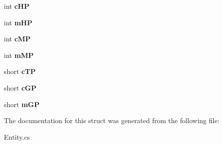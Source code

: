 \begin{DoxyCompactItemize}
\item 
\hypertarget{structffxivlib_1_1_entity_1_1_e_n_t_i_t_y_i_n_f_o_a4eb1c6c096373de42566abdbf6bc5921}{int {\bfseries c\-H\-P}}\label{structffxivlib_1_1_entity_1_1_e_n_t_i_t_y_i_n_f_o_a4eb1c6c096373de42566abdbf6bc5921}

\item 
\hypertarget{structffxivlib_1_1_entity_1_1_e_n_t_i_t_y_i_n_f_o_af2cbe0f7b155434b9995482b59a45992}{int {\bfseries m\-H\-P}}\label{structffxivlib_1_1_entity_1_1_e_n_t_i_t_y_i_n_f_o_af2cbe0f7b155434b9995482b59a45992}

\item 
\hypertarget{structffxivlib_1_1_entity_1_1_e_n_t_i_t_y_i_n_f_o_a81af69b94f15abeba9263682bd805ab5}{int {\bfseries c\-M\-P}}\label{structffxivlib_1_1_entity_1_1_e_n_t_i_t_y_i_n_f_o_a81af69b94f15abeba9263682bd805ab5}

\item 
\hypertarget{structffxivlib_1_1_entity_1_1_e_n_t_i_t_y_i_n_f_o_a3aad5eb2ed4ecff5e902cd054daf2d9b}{int {\bfseries m\-M\-P}}\label{structffxivlib_1_1_entity_1_1_e_n_t_i_t_y_i_n_f_o_a3aad5eb2ed4ecff5e902cd054daf2d9b}

\item 
\hypertarget{structffxivlib_1_1_entity_1_1_e_n_t_i_t_y_i_n_f_o_a680dced63aeb961d2d7ff24372f0b3df}{short {\bfseries c\-T\-P}}\label{structffxivlib_1_1_entity_1_1_e_n_t_i_t_y_i_n_f_o_a680dced63aeb961d2d7ff24372f0b3df}

\item 
\hypertarget{structffxivlib_1_1_entity_1_1_e_n_t_i_t_y_i_n_f_o_a905fc67478130ba6433fe2b9b4d0ddec}{short {\bfseries c\-G\-P}}\label{structffxivlib_1_1_entity_1_1_e_n_t_i_t_y_i_n_f_o_a905fc67478130ba6433fe2b9b4d0ddec}

\item 
\hypertarget{structffxivlib_1_1_entity_1_1_e_n_t_i_t_y_i_n_f_o_a27e352e8bc836e304bf2e894bb5e8763}{short {\bfseries m\-G\-P}}\label{structffxivlib_1_1_entity_1_1_e_n_t_i_t_y_i_n_f_o_a27e352e8bc836e304bf2e894bb5e8763}

\end{DoxyCompactItemize}


The documentation for this struct was generated from the following file\-:\begin{DoxyCompactItemize}
\item 
Entity.\-cs\end{DoxyCompactItemize}
